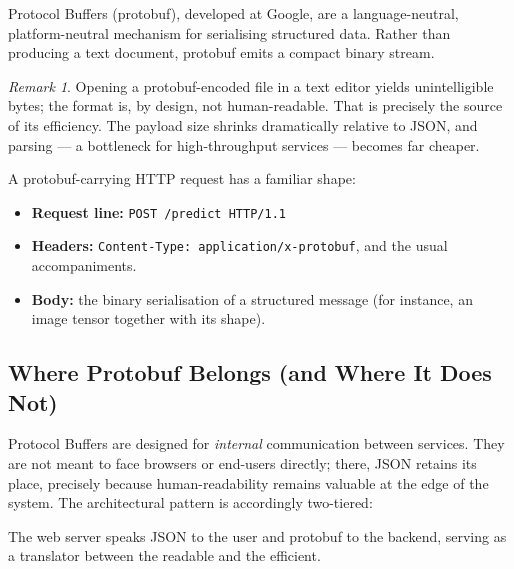 \documentclass[11pt,a4paper]{article}
\theoremstyle{definition}
\theoremstyle{remark}
\newtheorem*{remark}{Remark}
\begin{document}
Protocol Buffers (protobuf), developed at Google, are a language-neutral, platform-neutral mechanism for serialising structured data. Rather than producing a text document, protobuf emits a compact binary stream.

\begin{remark}
Opening a protobuf-encoded file in a text editor yields unintelligible bytes; the format is, by design, not human-readable. That is precisely the source of its efficiency. The payload size shrinks dramatically relative to JSON, and parsing --- a bottleneck for high-throughput services --- becomes far cheaper.
\end{remark}

A protobuf-carrying HTTP request has a familiar shape:
\begin{itemize}
    \item \textbf{Request line:} \texttt{POST /predict HTTP/1.1}
    \item \textbf{Headers:} \texttt{Content-Type: application/x-protobuf}, and the usual accompaniments.
    \item \textbf{Body:} the binary serialisation of a structured message (for instance, an image tensor together with its shape).
\end{itemize}

\subsection{Where Protobuf Belongs (and Where It Does Not)}

Protocol Buffers are designed for \emph{internal} communication between services. They are not meant to face browsers or end-users directly; there, JSON retains its place, precisely because human-readability remains valuable at the edge of the system. The architectural pattern is accordingly two-tiered:

\begin{center}
\end{center}

The web server speaks JSON to the user and protobuf to the backend, serving as a translator between the readable and the efficient.
\end{document}
